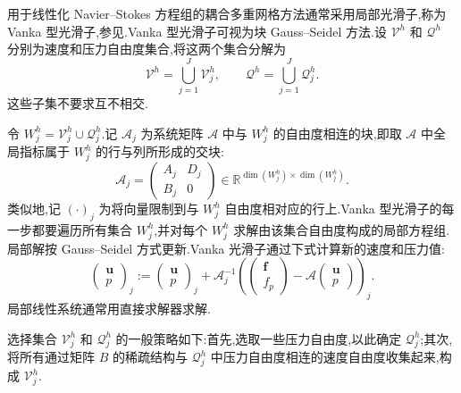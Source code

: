 \begin{note}
\label{note:chapter9-vanka-smoother}
用于线性化 Navier--Stokes 方程组的耦合多重网格方法通常采用局部光滑子,称为 Vanka 型光滑子,参见\textcite{Vanka1986}.Vanka 型光滑子可视为块 Gauss--Seidel 方法.设 $\mathcal V^h$ 和 $\mathcal Q^h$ 分别为速度和压力自由度集合,将这两个集合分解为
\begin{equation}\label{eq:chapter9-vanka-dof-partition}
 \mathcal V^h=\bigcup_{j=1}^{J}\mathcal V_j^h,
 \qquad
 \mathcal Q^h=\bigcup_{j=1}^{J}\mathcal Q_j^h.
\end{equation}
这些子集不要求互不相交.

令 $W_j^h=\mathcal V_j^h\cup\mathcal Q_j^h$.记 $\mathcal A_j$ 为系统矩阵 $\mathcal A$ 中与 $W_j^h$ 的自由度相连的块,即取 $\mathcal A$ 中全局指标属于 $W_j^h$ 的行与列所形成的交块:
\[
 \mathcal A_j=
 \begin{pmatrix}A_j&D_j\\B_j&0\end{pmatrix}
 \in\mathbb{R}^{\dim(W_j^h)\times\dim(W_j^h)}.
\]
类似地,记 $(\cdot)_j$ 为将向量限制到与 $W_j^h$ 自由度相对应的行上.Vanka 型光滑子的每一步都要遍历所有集合 $W_j^h$,并对每个 $W_j^h$ 求解由该集合自由度构成的局部方程组.局部解按 Gauss--Seidel 方式更新.Vanka 光滑子通过下式计算新的速度和压力值:
\[
 \begin{pmatrix}\bm u\\p\end{pmatrix}_j
 :=\begin{pmatrix}\bm u\\p\end{pmatrix}_j
 +\mathcal A_j^{-1}
   \left(
      \begin{pmatrix}\bm f\\f_p\end{pmatrix}
      -\mathcal A\begin{pmatrix}\bm u\\p\end{pmatrix}
   \right)_j.
\]
局部线性系统通常用直接求解器求解.

选择集合 $\mathcal V_j^h$ 和 $\mathcal Q_j^h$ 的一般策略如下:首先,选取一些压力自由度,以此确定 $\mathcal Q_j^h$;其次,将所有通过矩阵 $B$ 的稀疏结构与 $\mathcal Q_j^h$ 中压力自由度相连的速度自由度收集起来,构成 $\mathcal V_j^h$.
\end{note}



